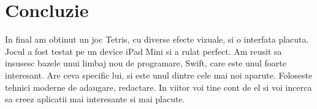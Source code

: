 \section*{Concluzie}


In final am obtinut un joc Tetris, cu diverse efecte vizuale, si o interfata placuta. Jocul a fost testat pe un device iPad Mini si a rulat perfect. Am reusit sa insusesc bazele unui limbaj nou de programare, Swift, care este unul foarte interesant. Are ceva specific lui, si este unul dintre cele mai noi aparute. Foloseste tehnici moderne de adaugare, redactare. In viitor voi tine cont de el si voi incerca sa creez aplicatii mai interesante si mai placute.

\clearpage